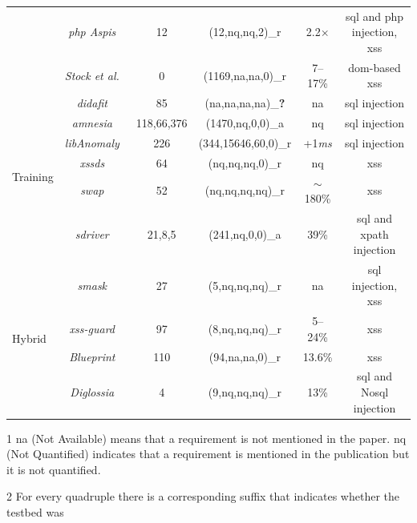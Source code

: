 \documentclass[conference]{IEEEtran}
\newcommand{\xmark}{\ding{56}}
\begin{document}
\begin{landscape}
\begin{table}
\begin{threeparttable}
\begin{small}
{\begin{tabular}{l|c|c|cc|c}
	&  	{\it {\sc php} Aspis}~\cite{PMP11} & 12 & (12,{\sc nq},{\sc nq},2)\_r & 2.2$\times$ & {\sc sql} and {\sc php} injection, {\sc xss} \\
	& 	{\it Stock et al.}~\cite{SLMS14} & 0 & (1169,{\sc na},{\sc na},0)\_r & 7--17\% & {\sc dom}-based {\sc xss} \\
	\hline
	\hline  
  \multirow{6}{*}{Training}
  &   {\it {\sc didafit}}~\cite{LLW02} & 85 & ({\sc na},{\sc na},{\sc na},{\sc na})\_{\bf ?} & {\sc na} & {\sc sql} injection \\
	&   {\it {\sc amnesia}}~\cite{HO05,HO06,HO05b} & 118,66,376 & (1470,{\sc nq},0,0)\_a & {\sc nq} & {\sc sql} injection \\ 
	&   {\it libAnomaly}~\cite{VMV05} & 226 & (344,15646,60,0)\_r & +1{\it ms} & {\sc sql} injection \\
	& 	{\it {\sc xssds}}~\cite{JEP08} & 64 & ({\sc nq},{\sc nq},{\sc nq},0)\_r & {\sc nq} &  {\sc xss} \\
  & 	{\it {\sc swap}}~\cite{WPLKK09} & 52 & ({\sc nq},{\sc nq},{\sc nq},{\sc nq})\_r & $\sim$180\% & {\sc xss} \\ 
	& 	{\it {\sc sd}river}~\cite{MS09,MKS09,MKLS11} & 21,8,5 & (241,{\sc nq},0,0)\_a & 39\% & {\sc sql} and {\sc xp}ath injection \\
  \hline
  \hline
  \multirow{4}{*}{Hybrid}
  &   {\it {\sc sm}ask}~\cite{JB07} & 27 & (5,{\sc nq},{\sc nq},{\sc nq})\_r  & {\sc na} & {\sc sql} injection, {\sc xss} \\
  &   {\it {\sc xss-guard}}~\cite{BV08} & 97 & (8,{\sc nq},{\sc nq},{\sc nq})\_r & 5--24\% & {\sc xss} \\
  &   {\it Blueprint}~\cite{LV09} & 110 & (94,{\sc na},{\sc na},0)\_r & 13.6\% & {\sc xss} \\
  &   {\it Diglossia}~\cite{SMS13} & 4 & (9,{\sc nq},{\sc nq},{\sc nq})\_r & 13\% & {\sc sql} and No{\sc sql} injection \\
	\hline
    \end{tabular}}
    \begin{tablenotes}
	\begin{footnotesize}
       	\item[1] {\sc na} (Not Available) means that a requirement is not mentioned in the paper.
	{\sc nq} (Not Quantified) indicates that a requirement is mentioned in the publication
	but it is not quantified.
		\item[2] For every quadruple there is a corresponding suffix that indicates whether the testbed was

\end{footnotesize}
\end{tablenotes}
\end{small}
\end{threeparttable}
\end{table}
\end{landscape}
\end{document}
